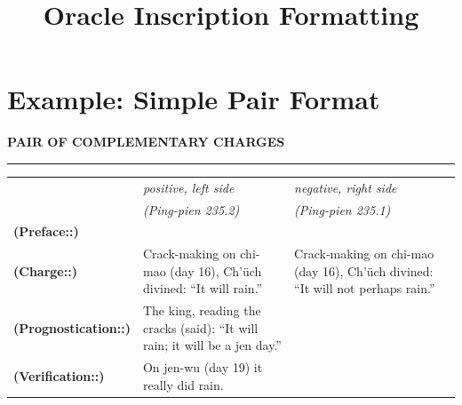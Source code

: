 \documentclass[11pt,a4paper]{book}
\title{Oracle Inscription Formatting}
\newcommand{\inscriptionref}[1]{\textit{(#1)}}
\newcommand{\inscriptionlabel}[1]{\textbf{(#1:)}}
\newcommand{\inscriptionside}[1]{\emph{#1}}
\newcommand{\inscriptionsection}[1]{%
  \par\vspace{0.5\baselineskip}
  \noindent\hfill\textbf{\MakeUppercase{#1}}\hfill\par
  \noindent\rule{\textwidth}{0.5pt}\par
  \vspace{0.3\baselineskip}
}
\begin{document}
\maketitle

\section*{Example: Simple Pair Format}

\inscriptionsection{PAIR OF COMPLEMENTARY CHARGES}

\noindent\begin{tabular}{p{1.2cm}|p{3.5cm}|p{3.5cm}}
\hline
& \centering\inscriptionside{positive, left side} & \centering\inscriptionside{negative, right side} \\
& \centering\inscriptionref{Ping-pien 235.2} & \centering\inscriptionref{Ping-pien 235.1} \\
\hline
\inscriptionlabel{Preface:} & \multicolumn{2}{c}{} \\
\inscriptionlabel{Charge:} & Crack-making on chi-mao (day 16), Ch'üch divined: ``It will rain.'' & Crack-making on chi-mao (day 16), Ch'üch divined: ``It will not perhaps rain.'' \\
\hline
\inscriptionlabel{Prognostication:} & The king, reading the cracks (said): ``It will rain; it will be a jen day.'' & \\
\hline
\inscriptionlabel{Verification:} & On jen-wu (day 19) it really did rain. & \\
\hline
\end{tabular}
\end{document}
